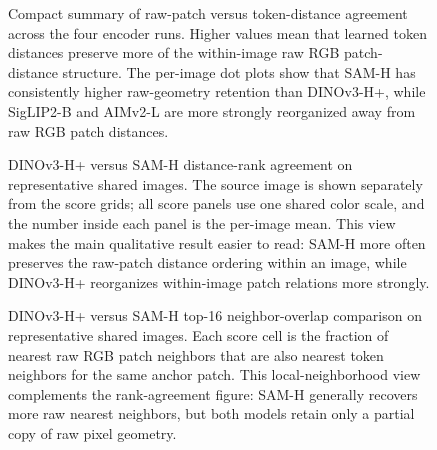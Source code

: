\begin{figure}[p]
\centering
{}
\caption{Compact summary of raw-patch versus token-distance agreement across the four  encoder runs. Higher values mean that learned token distances preserve more of the within-image raw RGB patch-distance structure. The per-image dot plots show that SAM-H has consistently higher raw-geometry retention than DINOv3-H+, while SigLIP2-B and AIMv2-L are more strongly reorganized away from raw RGB patch distances.}
\label{fig:app-patch-token-distance-digest}
\end{figure}

\begin{figure}[p]
\centering
{}
\caption{DINOv3-H+ versus SAM-H distance-rank agreement on representative shared  images. The source image is shown separately from the score grids; all score panels use one shared color scale, and the number inside each panel is the per-image mean. This view makes the main qualitative result easier to read: SAM-H more often preserves the raw-patch distance ordering within an image, while DINOv3-H+ reorganizes within-image patch relations more strongly.}
\label{fig:app-dino-sam-patch-token-rank-comparison}
\end{figure}

\begin{figure}[p]
\centering
{}
\caption{DINOv3-H+ versus SAM-H top-16 neighbor-overlap comparison on representative shared  images. Each score cell is the fraction of nearest raw RGB patch neighbors that are also nearest token neighbors for the same anchor patch. This local-neighborhood view complements the rank-agreement figure: SAM-H generally recovers more raw nearest neighbors, but both models retain only a partial copy of raw pixel geometry.}
\label{fig:app-dino-sam-patch-token-neighbor-comparison}
\end{figure}

\clearpage
